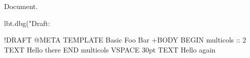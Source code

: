 \documentclass[a4paper,11pt]{article}
\begin{document}
  \lbtDebugModeOn{}

  Document.

  \begin{luacode*}
    lbt.dbg("Draft: %
  \end{luacode*}

  \begin{lbt}
    !DRAFT
    @META
      TEMPLATE Basic
      Foo      Bar
    +BODY
      BEGIN multicols :: 2
      TEXT Hello there
      END multicols
      VSPACE 30pt
      TEXT Hello again
  \end{lbt}
\end{document}
